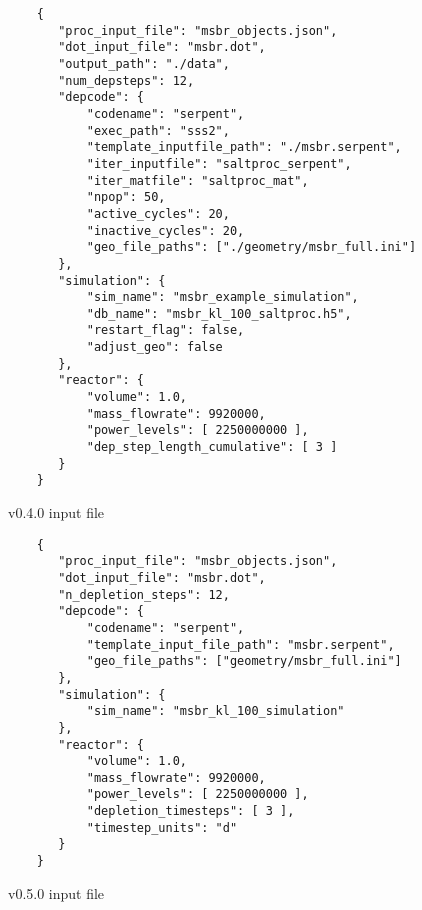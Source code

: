 \begin{listing}[!ht]
    \begin{verbatim}
    {
       "proc_input_file": "msbr_objects.json",
       "dot_input_file": "msbr.dot",
       "output_path": "./data",
       "num_depsteps": 12,
       "depcode": {
           "codename": "serpent",
           "exec_path": "sss2",
           "template_inputfile_path": "./msbr.serpent",
           "iter_inputfile": "saltproc_serpent",
           "iter_matfile": "saltproc_mat",
           "npop": 50,
           "active_cycles": 20,
           "inactive_cycles": 20,
           "geo_file_paths": ["./geometry/msbr_full.ini"]
       },
       "simulation": {
           "sim_name": "msbr_example_simulation",
           "db_name": "msbr_kl_100_saltproc.h5",
           "restart_flag": false,
           "adjust_geo": false
       },
       "reactor": {
           "volume": 1.0,
           "mass_flowrate": 9920000,
           "power_levels": [ 2250000000 ],
           "dep_step_length_cumulative": [ 3 ]
       }
    }
    \end{verbatim}
    \caption{\SaltProc v0.4.0 input file}
    \label{listing:2}
\end{listing}

\begin{listing}[!ht]
    \begin{verbatim}
    {
       "proc_input_file": "msbr_objects.json",
       "dot_input_file": "msbr.dot",
       "n_depletion_steps": 12,
       "depcode": {
           "codename": "serpent",
           "template_input_file_path": "msbr.serpent",
           "geo_file_paths": ["geometry/msbr_full.ini"]
       },
       "simulation": {
           "sim_name": "msbr_kl_100_simulation"
       },
       "reactor": {
           "volume": 1.0,
           "mass_flowrate": 9920000,
           "power_levels": [ 2250000000 ],
           "depletion_timesteps": [ 3 ],
           "timestep_units": "d"
       }
    }
    \end{verbatim}
    \caption{\SaltProc v0.5.0 input file}
    \label{listing:3}
\end{listing}